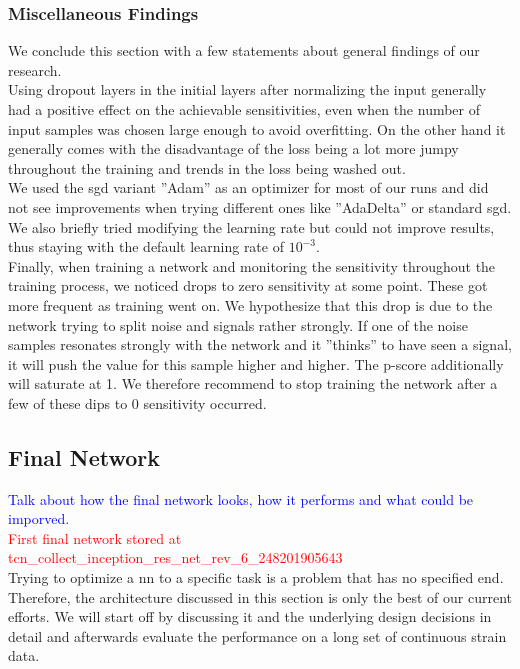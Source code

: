 \subsubsection{Miscellaneous Findings}
We conclude this section with a few statements about general findings of our research.\\
Using dropout layers in the initial layers after normalizing the input generally had a positive effect on the achievable sensitivities, even when the number of input samples was chosen large enough to avoid overfitting. On the other hand it generally comes with the disadvantage of the loss being a lot more jumpy throughout the training and trends in the loss being washed out.\\
We used the \gls{sgd} variant ''Adam'' as an optimizer for most of our runs and did not see improvements when trying different ones like ''AdaDelta'' or standard \gls{sgd}. We also briefly tried modifying the learning rate but could not improve results, thus staying with the default learning rate of $10^{-3}$.\\
Finally, when training a network and monitoring the sensitivity throughout the training process, we noticed drops to zero sensitivity at some point. These got more frequent as training went on. We hypothesize that this drop is due to the network trying to split noise and signals rather strongly. If one of the noise samples resonates strongly with the network and it ''thinks'' to have seen a signal, it will push the value for this sample higher and higher. The p-score additionally will saturate at 1. We therefore recommend to stop training the network after a few of these dips to 0 sensitivity occurred.


\subsection{Final Network}
\textcolor{blue}{Talk about how the final network looks, how it performs and what could be imporved.}\\
\textcolor{red}{First final network stored at tcn\_collect\_inception\_res\_net\_rev\_6\_248201905643}\\
Trying to optimize a \gls{nn} to a specific task is a problem that has no specified end. Therefore, the architecture discussed in this section is only the best of our current efforts. We will start off by discussing it and the underlying design decisions in detail and afterwards evaluate the performance on a long set of continuous strain data.
